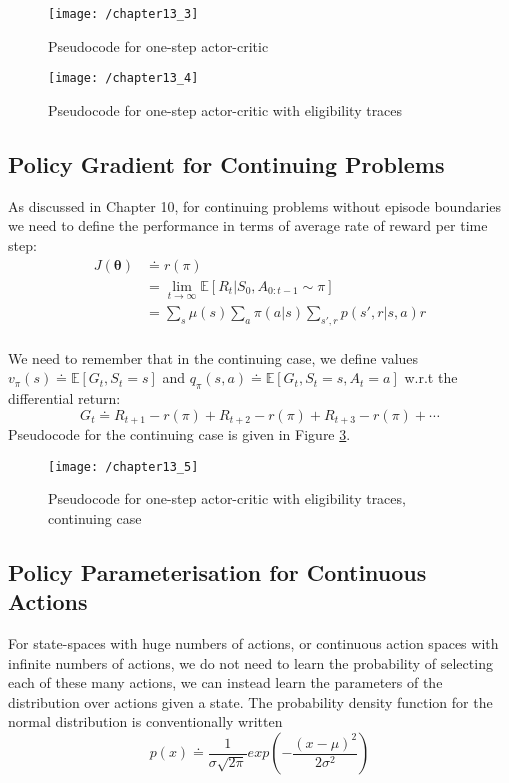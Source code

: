 \begin{figure}
	\centering
	\texttt{[image: /chapter13\_3]}
	\caption{Pseudocode for one-step actor-critic}
	\label{fig: 13_3}
\end{figure}

\begin{figure}
	\centering
	\texttt{[image: /chapter13\_4]}
	\caption{Pseudocode for one-step actor-critic with eligibility traces}
	\label{fig: 13_4}
\end{figure}

\subsection{Policy Gradient for Continuing Problems}
As discussed in Chapter 10, for continuing problems without episode boundaries we need to define the performance in terms of average rate of reward per time step:
\begin{align}
J(\boldsymbol{\theta}) &\doteq r(\pi) \\
&= \lim_{t \rightarrow \infty} \mathbb{E} [R_t | S_0, A_{0:t-1} \sim \pi] \\
&= \sum_{s} \mu(s) \sum_{a} \pi(a | s) \sum_{s', r} p(s', r | s, a) r \\ 
\end{align}

We need to remember that in the continuing case, we define values $v_\pi(s) \doteq \mathbb{E}[G_t, S_t = s]$ and $q_\pi(s,a) \doteq \mathbb{E}[G_t, S_t = s, A_t = a]$ w.r.t the differential return:
\begin{equation}
G_t \doteq R_{t+1} - r(\pi) + R_{t+2} - r(\pi) + R_{t+3} - r(\pi) + \cdots
\end{equation}
Pseudocode for the continuing case is given in Figure \ref{fig: 13_5}.

\begin{figure}
	\centering
	\texttt{[image: /chapter13\_5]}
	\caption{Pseudocode for one-step actor-critic with eligibility traces, continuing case}
	\label{fig: 13_5}
\end{figure}

\subsection{Policy Parameterisation for Continuous Actions}
For state-spaces with huge numbers of actions, or continuous action spaces with infinite numbers of actions, we do not need to learn the probability of selecting each of these many actions, we can instead learn the parameters of the distribution over actions given a state. The probability density function for the normal distribution is conventionally written
\begin{equation}
p(x) \doteq \frac{1}{\sigma \sqrt{2 \pi}}exp\left(-\frac{(x - \mu)^2}{2 \sigma^2}\right)
\end{equation}


